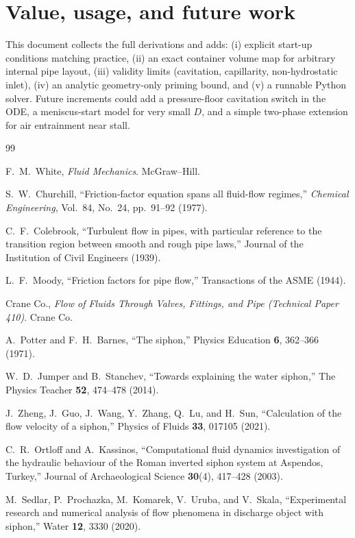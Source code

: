 \documentclass[11pt]{article}
\begin{document}
\section{Value, usage, and future work}
This document collects the full derivations and adds: (i) explicit start-up conditions matching practice, (ii) an exact container volume map for arbitrary internal pipe layout, (iii) validity limits (cavitation, capillarity, non-hydrostatic inlet), (iv) an analytic geometry-only priming bound, and (v) a runnable Python solver. Future increments could add a pressure-floor cavitation switch in the ODE, a meniscus-start model for very small $D$, and a simple two-phase extension for air entrainment near stall.

\begin{thebibliography}{99}

F.~M.~White,
\emph{Fluid Mechanics}.
McGraw--Hill.

S.~W.~Churchill,
``Friction-factor equation spans all fluid-flow regimes,''
\emph{Chemical Engineering}, Vol.~84, No.~24, pp.~91--92 (1977).

C.~F.~Colebrook,
``Turbulent flow in pipes, with particular reference to the transition region
between smooth and rough pipe laws,''
Journal of the Institution of Civil Engineers (1939).

L.~F.~Moody,
``Friction factors for pipe flow,''
Transactions of the ASME (1944).

Crane Co.,
\emph{Flow of Fluids Through Valves, Fittings, and Pipe (Technical Paper 410)}.
Crane Co.

A.~Potter and F.~H.~Barnes,
``The siphon,''
Physics Education \textbf{6}, 362--366 (1971).

W.~D.~Jumper and B.~Stanchev,
``Towards explaining the water siphon,''
The Physics Teacher \textbf{52}, 474--478 (2014).

J.~Zheng, J.~Guo, J.~Wang, Y.~Zhang, Q.~Lu, and H.~Sun,
``Calculation of the flow velocity of a siphon,''
Physics of Fluids \textbf{33}, 017105 (2021).

C.~R.~Ortloff and A.~Kassinos,
``Computational fluid dynamics investigation of the hydraulic behaviour of the Roman inverted siphon system at Aspendos, Turkey,''
Journal of Archaeological Science \textbf{30}(4), 417--428 (2003).

M.~Sedlar, P.~Prochazka, M.~Komarek, V.~Uruba, and V.~Skala,
``Experimental research and numerical analysis of flow phenomena in discharge object with siphon,''
Water \textbf{12}, 3330 (2020).


\end{thebibliography}
\end{document}
